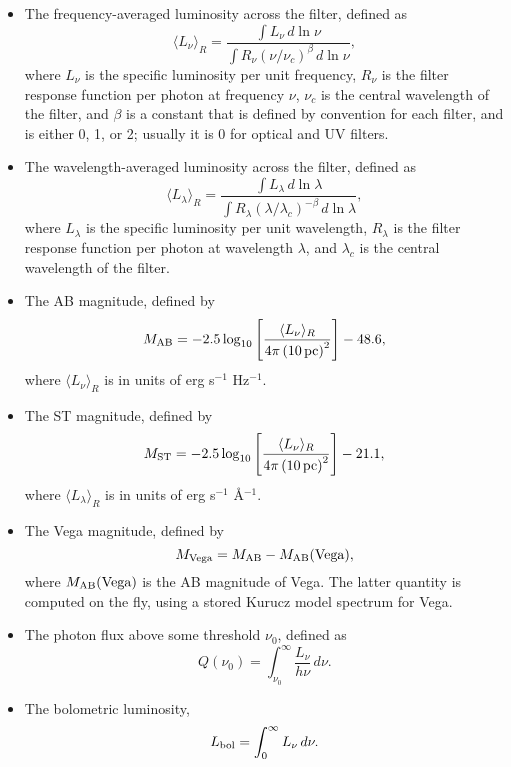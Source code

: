 \documentclass[12pt]{article}
\begin{document}
\begin{itemize}
\item The frequency-averaged luminosity across the filter, defined as
\begin{equation}
\langle L_\nu\rangle_R = \frac{\int L_\nu \, d\ln\nu}{\int R_\nu (\nu/\nu_c)^\beta \, d\ln\nu},
\end{equation}
where $L_\nu$ is the specific luminosity per unit frequency, $R_\nu$ is the filter response function per photon at frequency $\nu$, $\nu_c$ is the central wavelength of the filter, and $\beta$ is a constant that is defined by convention for each filter, and is either 0, 1, or 2; usually it is 0 for optical and UV filters.
\item The wavelength-averaged luminosity across the filter, defined as
\begin{equation}
\langle L_\lambda\rangle_R = \frac{\int L_\lambda \, d\ln\lambda}{\int R_\lambda (\lambda/\lambda_c)^{-\beta} \, d\ln\lambda},
\end{equation}
where $L_\lambda$ is the specific luminosity per unit wavelength, $R_\lambda$ is the filter response function per photon at wavelength $\lambda$, and $\lambda_c$ is the central wavelength of the filter.
\item The AB magnitude, defined by
\begin{equation}
M_{\rm AB} = -2.5 \log_{10} \left[\frac{\langle L_\nu\rangle_R}{4\pi\left(10\,\mathrm{pc}\right)^2}\right] - 48.6,
\end{equation}
where $\langle L_\nu\rangle_R$ is in units of erg s$^{-1}$ Hz$^{-1}$.
\item The ST magnitude, defined by
\begin{equation}
M_{\rm ST} = -2.5 \log_{10} \left[\frac{\langle L_\nu\rangle_R}{4\pi\left(10\,\mathrm{pc}\right)^2}\right] - 21.1,
\end{equation}
where $\langle L_\lambda\rangle_R$ is in units of erg s$^{-1}$ \AA$^{-1}$.
\item The Vega magnitude, defined by
\begin{equation}
M_{\rm Vega} = M_{\rm AB} - M_{\rm AB}(\mbox{Vega}),
\end{equation}
where $M_{\rm AB}(\mbox{Vega})$ is the AB magnitude of Vega. The latter quantity is computed on the fly, using a stored Kurucz model spectrum for Vega. 
\item The photon flux above some threshold $\nu_0$, defined as
\begin{equation}
Q(\nu_0) = \int_{\nu_0}^\infty \frac{L_\nu}{h\nu} \, d\nu.
\end{equation}
\item The bolometric luminosity,
\begin{equation}
L_{\rm bol} = \int_0^\infty L_\nu \, d\nu.
\end{equation}
\end{itemize}
\end{document}
